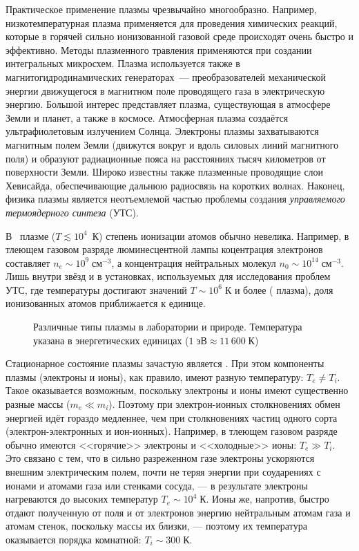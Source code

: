 Практическое применение плазмы чрезвычайно многообразно.
Например, низкотемпературная плазма применяется 
для проведения химических реакций, которые в горячей
сильно ионизованной газовой среде происходят очень быстро и эффективно.
Методы плазменного травления применяются при создании интегральных
микросхем. Плазма используется также в магнитогидродинамических генераторах~--- 
преобразователей механической энергии движущегося в магнитном поле проводящего газа в
электрическую энергию.
Большой интерес представляет плазма, существующая в атмосфере Земли и планет, а
также в космосе. Атмосферная плазма создаётся ультрафиолетовым излучением
Солнца. Электроны плазмы захватываются магнитным полем Земли (движутся вокруг и
вдоль силовых линий магнитного поля) и образуют радиационные пояса на
расстояниях тысяч километров от поверхности Земли. Широко известны также
плазменные проводящие слои Хевисайда, обеспечивающие дальнюю радиосвязь
на коротких волнах. 
Наконец, физика плазмы является неотъемлемой частью проблемы создания 
\emph{управляемого термоядерного синтеза} (УТС).


В~ плазме ($T\lesssim 10^4$~К) степень ионизации 
атомов обычно невелика. Например, в тлеющем газовом разряде 
люминесцентной лампы коцентрация электронов составляет 
$n_e\sim 10^9\;\text{см}^{-3}$,
а концентрация нейтральных молекул $n_0\sim 10^{14}\;\text{см}^{-3}$.
Лишь внутри звёзд и в установках, используемых для исследования проблем 
УТС, где температуры достигают значений $T \sim 10^{6}\;К$ и более
( плазма),
доля ионизованных атомов приближается к единице.

\begin{figure}[ht]
    \centering
    {\footnotesize
    }
    \caption{Различные типы плазмы в лаборатории и природе. Температура
    указана в энергетических единицах ($1\;эВ\approx 11\,600\;К$)}
\end{figure}

Стационарное состояние плазмы зачастую является .
При этом компоненты плазмы (электроны и ионы), как
правило, имеют разную температуру: $T_e\ne T_i$. 
Такое оказывается возможным, поскольку 
электроны и ионы имеют существенно разные массы ($m_e \ll m_i$).
Поэтому при электрон-ионных столкновениях обмен энергией идёт гораздо медленнее,
чем при столкновениях частиц одного сорта (электрон-электронных и ион-ионных).
Например, в тлеющем газовом разряде обычно имеются 
<<горячие>> электроны и <<холодные>> ионы: $T_e \gg T_i$.
Это связано с тем, что в сильно разреженном газе электроны ускоряются 
внешним электрическим полем, почти не теряя энергии при соударениях 
с ионами и атомами газа или стенками сосуда, --- в результате электроны
нагреваются до высоких температур $T_e\sim 10^4\;К$.
Ионы же, напротив, быстро отдают полученную от поля и от электронов энергию 
нейтральным атомам газа и атомам стенок, поскольку массы их близки, 
--- поэтому их температура оказывается порядка комнатной: $T_i \sim 300\;К$.


